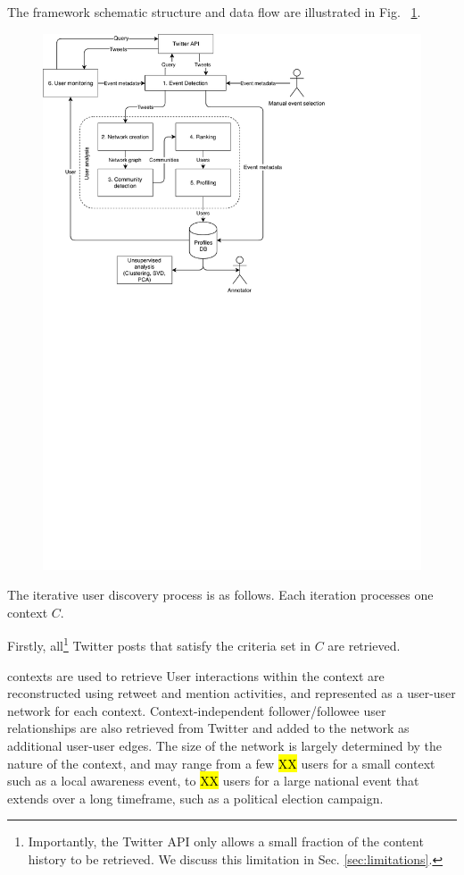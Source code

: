 \documentclass[runningheads]{llncs}
\begin{document}
The framework schematic structure and data flow are illustrated in Fig. ~\ref{fig:twitterframework}.


\begin{figure}
	\centering
	\includegraphics[width=0.7\linewidth]{figures/TwitterFramework}
	\caption{}
	\label{fig:twitterframework}
\end{figure}

The iterative user discovery process is as follows.
Each iteration processes one context $C$. 

Firstly, all\footnote{Importantly, the Twitter API only allows a small fraction of the content history to be retrieved. We discuss this limitation in Sec. \ref{sec:limitations}.}
Twitter posts that satisfy the criteria set in $C$ are retrieved.

contexts are used to retrieve 
User interactions within the context are reconstructed using retweet and mention activities, and represented as a user-user network for each context. 
%
Context-independent follower/followee user relationships are also retrieved from Twitter and added to the network as additional user-user edges.
The size of the network is largely determined by the nature of the context, and may range from a few \hl{XX} users for a small context such as a local awareness event, to \hl{XX} users for a large national event that extends over a long timeframe, such as a political election campaign.
\end{document}

